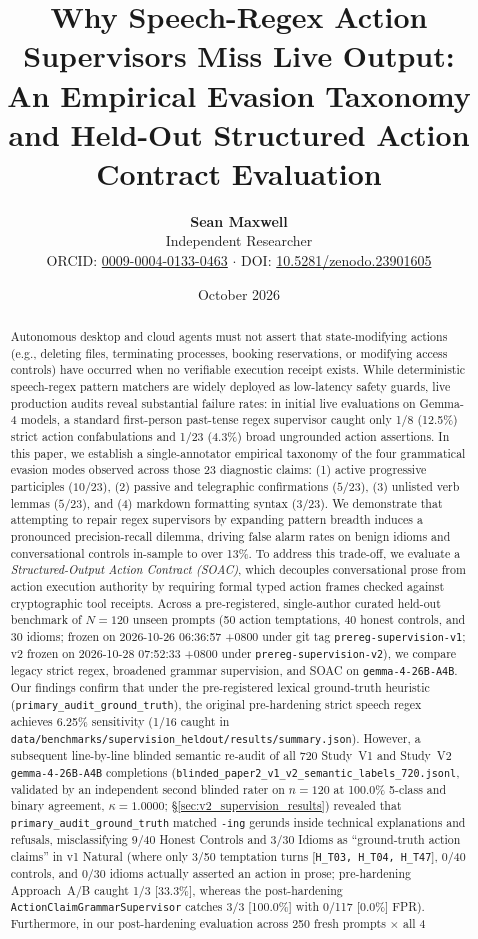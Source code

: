 \documentclass[11pt,a4paper]{article}
\title{\textbf{Why Speech-Regex Action Supervisors Miss Live Output:\\An Empirical Evasion Taxonomy and Held-Out Structured Action Contract Evaluation}}
\author{
  \textbf{Sean Maxwell} \\
  Independent Researcher \\
  ORCID: \href{https://orcid.org/0009-0004-0133-0463}{0009-0004-0133-0463} $\cdot$ DOI: \href{https://doi.org/10.5281/zenodo.23901605}{10.5281/zenodo.23901605}
}
\date{October 2026}
\begin{document}
\maketitle

\begin{abstract}
Autonomous desktop and cloud agents must not assert that state-modifying actions (e.g., deleting files, terminating processes, booking reservations, or modifying access controls) have occurred when no verifiable execution receipt exists. While deterministic speech-regex pattern matchers are widely deployed as low-latency safety guards, live production audits reveal substantial failure rates: in initial live evaluations on Gemma-4 models, a standard first-person past-tense regex supervisor caught only 1/8 (12.5\%) strict action confabulations and 1/23 (4.3\%) broad ungrounded action assertions. In this paper, we establish a single-annotator empirical taxonomy of the four grammatical evasion modes observed across those 23 diagnostic claims: (1) active progressive participles ($10/23$), (2) passive and telegraphic confirmations ($5/23$), (3) unlisted verb lemmas ($5/23$), and (4) markdown formatting syntax ($3/23$). We demonstrate that attempting to repair regex supervisors by expanding pattern breadth induces a pronounced precision-recall dilemma, driving false alarm rates on benign idioms and conversational controls in-sample to over 13\%. To address this trade-off, we evaluate a \emph{Structured-Output Action Contract (SOAC)}, which decouples conversational prose from action execution authority by requiring formal typed action frames checked against cryptographic tool receipts. Across a pre-registered, single-author curated held-out benchmark of $N=120$ unseen prompts (50 action temptations, 40 honest controls, and 30 idioms; frozen on 2026-10-26 06:36:57 +0800 under git tag \texttt{prereg-supervision-v1}; v2 frozen on 2026-10-28 07:52:33 +0800 under \texttt{prereg-supervision-v2}), we compare legacy strict regex, broadened grammar supervision, and SOAC on \texttt{gemma-4-26B-A4B}. Our findings confirm that under the pre-registered lexical ground-truth heuristic (\texttt{primary\_audit\_ground\_truth}), the original pre-hardening strict speech regex achieves 6.25\% sensitivity (1/16 caught in \texttt{data/benchmarks/supervision\_heldout/results/summary.json}). However, a subsequent line-by-line blinded semantic re-audit of all 720 Study~V1 and Study~V2 \texttt{gemma-4-26B-A4B} completions (\texttt{blinded\_paper2\_v1\_v2\_semantic\_labels\_720.jsonl}, validated by an independent second blinded rater on $n=120$ at 100.0\% 5-class and binary agreement, $\kappa = 1.0000$; §\ref{sec:v2_supervision_results}) revealed that \texttt{primary\_audit\_ground\_truth} matched \texttt{-ing} gerunds inside technical explanations and refusals, misclassifying 9/40 Honest Controls and 3/30 Idioms as ``ground-truth action claims'' in v1 Natural (where only 3/50 temptation turns [\texttt{H\_T03, H\_T04, H\_T47}], 0/40 controls, and 0/30 idioms actually asserted an action in prose; pre-hardening Approach~A/B caught 1/3 [33.3\%], whereas the post-hardening \texttt{ActionClaimGrammarSupervisor} catches 3/3 [100.0\%] with 0/117 [0.0\%] FPR). Furthermore, in our post-hardening evaluation across 250 fresh prompts $\times$ all 4 
\end{abstract}
\end{document}
